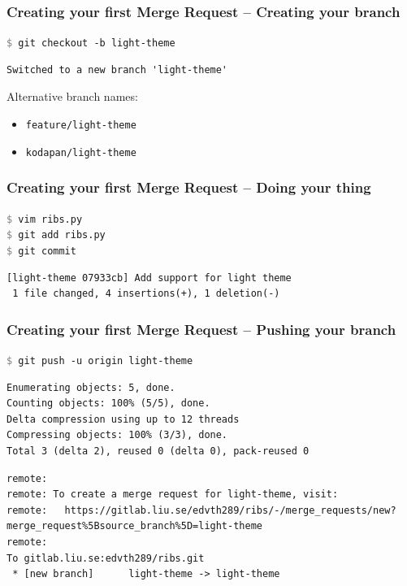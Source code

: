 \documentclass{beamer}
\newcommand{\command}[1]{\texttt{\textcolor{gray}{\$} {#1}}}
\begin{document}
\begin{frame}[fragile]
  \frametitle{Creating your first Merge Request -- Creating your branch}
  \command{git checkout -b light-theme}
\begin{verbatim}
Switched to a new branch 'light-theme'
\end{verbatim}

\pause{}

Alternative branch names:
\begin{itemize}
  \item \texttt{feature/light-theme}
  \item \texttt{kodapan/light-theme}
\end{itemize}
\end{frame}

\begin{frame}[fragile]
  \frametitle{Creating your first Merge Request -- Doing your thing}
  \command{vim ribs.py}\\
  \command{git add ribs.py}\\
  \command{git commit}
\begin{verbatim}
[light-theme 07933cb] Add support for light theme
 1 file changed, 4 insertions(+), 1 deletion(-)
\end{verbatim}
\end{frame}

\begin{frame}[fragile]
  \frametitle{Creating your first Merge Request -- Pushing your branch}
  \command{git push -u origin light-theme}
\pause
\vspace{-0.6ex}
{
\color{gray}
\begin{Verbatim}[commandchars=\\\{\}]
Enumerating objects: 5, done.
Counting objects: 100% (5/5), done.
Delta compression using up to 12 threads
Compressing objects: 100% (3/3), done.
Total 3 (delta 2), reused 0 (delta 0), pack-reused 0
\end{Verbatim}
}
\vspace{-1.2ex}
\begin{Verbatim}[commandchars=\\\{\}]
remote:
remote: To create a merge request for light-theme, visit:
remote:   https://gitlab.liu.se/edvth289/ribs/-/merge_requests/new?merge_request%5Bsource_branch%5D=light-theme
remote:
To gitlab.liu.se:edvth289/ribs.git
 * [new branch]      light-theme -> light-theme
\end{Verbatim}
\end{frame}
\end{document}
